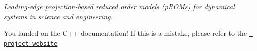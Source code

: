 \label{index_md_pages_main}%
%
 {\itshape Leading-\/edge projection-\/based reduced order models (p\+R\+O\+Ms) for dynamical systems in science and engineering.}

You landed on the C++ documentation! If this is a mistake, please refer to the \href{(https://pressio.github.io/)}{\texttt{ project website}} ~\newline
 